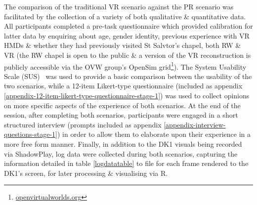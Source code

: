 The comparison of the traditional VR scenario against the PR scenario was facilitated by the collection of a variety of both qualitative \& quantitative data. All participants completed a pre-task questionnaire which provided calibration for latter data by enquiring about age, gender identity, previous experience with VR HMDs \& whether they had previously visited St Salvtor's chapel, both RW \& VR (the RW chapel is open to the public \& a version of the VR reconstruction is publicly accessible via the OVW group's OpenSim grid\footnote{\url{openvirtualworlds.org}}). The System Usability Scale (SUS)~\cite{Brooke1996} was used to provide a basic comparison between the usability of the two scenarios, while a 12-item Likert-type questionnaire (included as appendix \ref{appendix-12-item-likert-type-questionnaire-stage-1}) was used to collect opinions on more specific aspects of the experience of both scenarios. At the end of the session, after completing both scenarios, participants were engaged in a short structured interview (prompts included as appendix \ref{appendix-interview-questions-stage-1}) in order to allow them to elaborate upon their experience in a more free form manner. Finally, in addition to the DK1 visuals being recorded via ShadowPlay, log data were collected during both scenarios, capturing the information detailed in table \ref{logdatatable} to file for each frame rendered to the DK1's screen, for later processing \& visualising via R.

